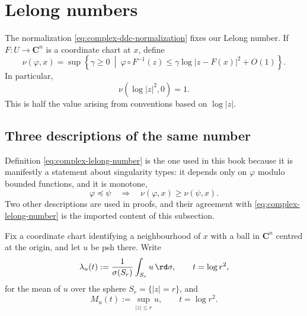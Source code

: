 \section{Lelong numbers}
\label{sec:ch51-lelong}

The normalization \eqref{eq:complex-ddc-normalization} fixes our Lelong
number.  If $F:U\to\mathbf C^n$ is a coordinate chart at $x$, define
\[
 \nu(\varphi,x)
 =\sup\left\{\gamma\geq0\ \middle|\ 
 \varphi\circ F^{-1}(z)
 \leq\gamma\log|z-F(x)|^2+O(1)\right\}.
\tag{51.6}\label{eq:complex-lelong-number}
\]
In particular,
\[
                         \nu(\log|z|^2,0)=1.
\tag{51.7}\label{eq:complex-lelong-model}
\]
This is half the value arising from conventions based on $\log|z|$.

\subsection{Three descriptions of the same number}
\label{sec:ch51-lelong-three}

Definition \eqref{eq:complex-lelong-number} is the one used in this book
because it is manifestly a statement about singularity types: it depends
only on $\varphi$ modulo bounded functions, and it is monotone,
\[
 \varphi\preceq\psi
 \quad\Longrightarrow\quad
 \nu(\varphi,x)\geq\nu(\psi,x).
\]
Two other descriptions are used in proofs, and their agreement with
\eqref{eq:complex-lelong-number} is the imported content of this
subsection.

Fix a coordinate chart identifying a neighbourhood of $x$ with a ball in
$\mathbf C^n$ centred at the origin, and let $u$ be psh there.  Write
\[
 \lambda_u(t)
 :=\frac{1}{\sigma(S_r)}\int_{S_r}u\,\rd\sigma,
 \qquad
 t=\log r^2,
\]
for the mean of $u$ over the sphere $S_r=\{|z|=r\}$, and
\[
 M_u(t):=\sup_{|z|\leq r}u,\qquad t=\log r^2 .
\]

